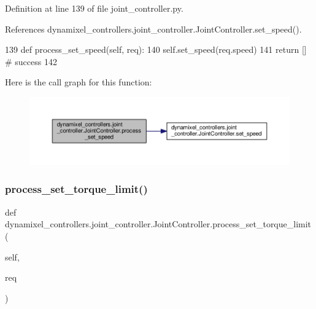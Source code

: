 Definition at line 139 of file joint\+\_\+controller.\+py.



References dynamixel\+\_\+controllers.\+joint\+\_\+controller.\+Joint\+Controller.\+set\+\_\+speed().


\begin{DoxyCode}
139     \textcolor{keyword}{def }process\_set\_speed(self, req):
140         self.set\_speed(req.speed)
141         \textcolor{keywordflow}{return} [] \textcolor{comment}{# success}
142 
\end{DoxyCode}
Here is the call graph for this function\+:
\nopagebreak
\begin{figure}[H]
\begin{center}
\leavevmode
\includegraphics[width=350pt]{d3/dcd/classdynamixel__controllers_1_1joint__controller_1_1_joint_controller_a97af096c1566307859ed168c900fa8a6_cgraph}
\end{center}
\end{figure}
\mbox{\label{classdynamixel__controllers_1_1joint__controller_1_1_joint_controller_aa199ce6ae353ed44fe71ae96a5da242d}} 
\subsubsection{\texorpdfstring{process\+\_\+set\+\_\+torque\+\_\+limit()}{process\_set\_torque\_limit()}}
{\footnotesize\ttfamily def dynamixel\+\_\+controllers.\+joint\+\_\+controller.\+Joint\+Controller.\+process\+\_\+set\+\_\+torque\+\_\+limit (\begin{DoxyParamCaption}\item[{}]{self,  }\item[{}]{req }\end{DoxyParamCaption})}



